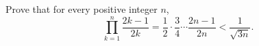Prove that for every positive integer $n$,
\[\prod_{k=1}^{n}\dfrac{2k-1}{2k}=\dfrac12\cdot\dfrac34\cdots\dfrac{2n-1}{2n}<\dfrac{1}{\sqrt{3n}}.\]
